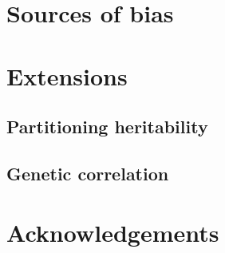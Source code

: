 \documentclass[11pt]{article}
\begin{document}
\section{Sources of bias}

\section{Extensions}

\subsection{Partitioning heritability}

\subsection{Genetic correlation}

\section{Acknowledgements}




\end{document}
